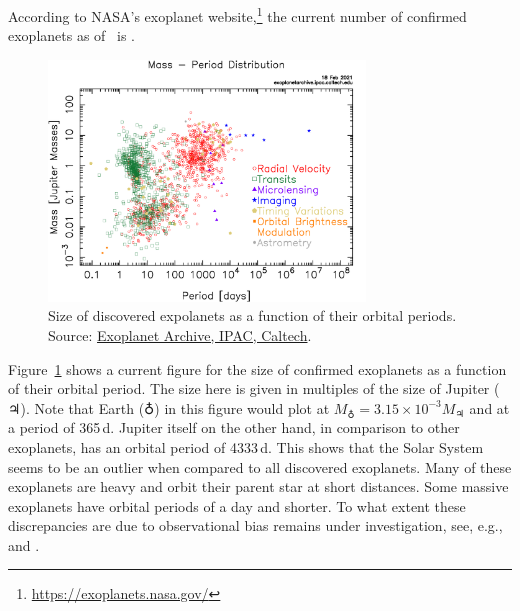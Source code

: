 According to NASA's exoplanet website,\footnote{\url{https://exoplanets.nasa.gov/}} the current number of confirmed exoplanets as of \ExoplanetDate\ is \ExoplanetsNumber.
\begin{figure}[tb]
    \centering
    \includegraphics[width=0.75\textwidth]{graphics/sun/exoplanets_radius_period}
    \caption{Size of discovered expolanets as a function of their orbital periods. Source: \href{https://exoplanetarchive.ipac.caltech.edu/}{Exoplanet Archive, IPAC, Caltech}.}
    \label{fig:sun:exoplanets}
\end{figure}
Figure~\ref{fig:sun:exoplanets} shows a current figure for the size of confirmed exoplanets as a function of their orbital period. The size here is given in multiples of the size of Jupiter ($\jupiter$). Note that Earth ($\earth$) in this figure would plot at $M_{\earth} = 3.15 \times 10^{-3} M_{\jupiter}$ and at a period of 365\,d. Jupiter itself on the other hand, in comparison to other exoplanets, has an orbital period of 4333\,d. This shows that the Solar System seems to be an outlier when compared to all discovered exoplanets. Many of these exoplanets are heavy and orbit their parent star at short distances. Some massive exoplanets have orbital periods of a day and shorter. To what extent these discrepancies are due to observational bias remains under investigation, see, e.g., \citet{mulders18} and \citet{mulders19}.

\begin{table}[b]
\end{table}


